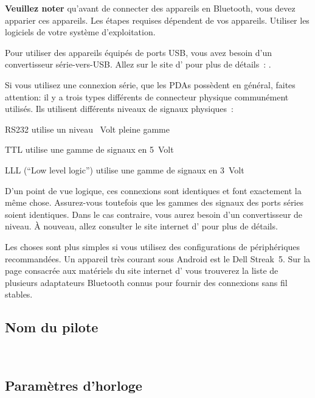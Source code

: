 \documentclass[french, a4paper, 12pt]{refrep}
\renewcommand{\config}[3]{\bmenut{Config}{#1/3}{\LARGE$\triangleright$}~\bmenut{#2}{#3}}%
\begin{document}
\textbf{Veuillez noter} qu'avant de connecter des appareils en Bluetooth, vous devez
apparier ces appareils. Les étapes requises dépendent de vos appareils.
Utiliser les logiciels de votre système d'exploitation. 

Pour utiliser des appareils équipés de ports USB, vous avez besoin d'un convertisseur série-vers-USB. Allez
sur le site d'\xc{} pour plus de détails~: .

Si vous utilisez une connexion série, que les PDAs possèdent en général, faites 
attention: il y a trois types différents de connecteur physique communément utilisés.
Ils utilisent différents niveaux de signaux physiques~:
\begin{compactitem}
\item RS232 utilise un niveau ~Volt pleine gamme
\item TTL utilise une gamme de signaux en 5~Volt
\item LLL (``Low level logic'') utilise une gamme de signaux en 3~Volt
\end{compactitem}
D'un point de vue logique, ces connexions sont identiques et font exactement
la même chose.
Assurez-vous toutefois que les gammes des signaux des ports séries soient identiques. Dans le cas contraire, vous aurez besoin d'un convertisseur
de niveau. À nouveau, allez consulter le site internet d'\xc{} pour plus de détails.

Les choses sont plus simples si vous utilisez des configurations de périphériques recommandées. Un appareil très courant sous Android
est le Dell Streak~5. Sur la page consacrée aux matériels du site internet d'\xc{} vous trouverez la liste de plusieurs adaptateurs Bluetooth connus
pour fournir des connexions sans fil stables.

\subsection{\textcolor{flashblue}{Nom du pilote}}
\begin{flushleft}\hspace*{1cm}\config{2}{Système}{}\blink{}\blink{}\\\end{flushleft}

\subsection{\textcolor{flashblue}{Paramètres d'horloge}}
\begin{flushleft}\hspace*{1cm}\config{2}{Système}{}\blink{}\blink{}\\\end{flushleft}
\end{document}
